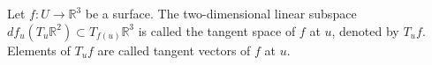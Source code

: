 Let $f: U \to \mathbb{R}^3$ be a surface. The two-dimensional linear subspace $df_u(T_u\mathbb{R}^2) \subset T_{f(u)}\mathbb{R}^3$ is called the tangent space of $f$ at $u$, denoted by $T_u f$. Elements of $T_u f$ are called tangent vectors of $f$ at $u$.